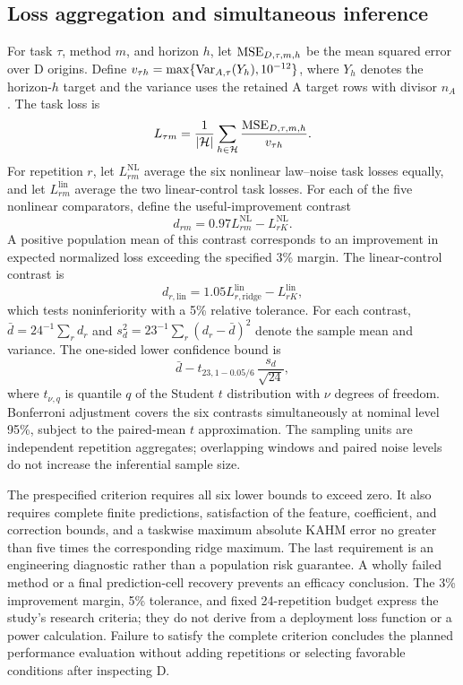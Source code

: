 \subsection{Loss aggregation and simultaneous inference}

For task $\tau$, method $m$, and horizon $h$, let
$\operatorname{MSE}_{D,\tau,m,h}$ be the mean squared error over D origins. Define
$v_{\tau h}=\max\{\operatorname{Var}_{A,\tau}(Y_h),10^{-12}\}$, where $Y_h$
denotes the horizon-$h$ target and the
variance uses the retained A target rows with divisor $n_A$. The task loss is
\[
 L_{\tau m}=\frac1{|\mathcal H|}\sum_{h\in\mathcal H}
       \frac{\operatorname{MSE}_{D,\tau,m,h}}{v_{\tau h}}.
\]
For repetition $r$, let $L^{\mathrm{NL}}_{rm}$ average the six nonlinear
law--noise task losses equally, and let $L^{\mathrm{lin}}_{rm}$ average
the two linear-control task losses. For each of the five nonlinear
comparators, define the useful-improvement contrast
\[
 d_{rm}=0.97L^{\mathrm{NL}}_{rm}-L^{\mathrm{NL}}_{rK}.
\]
A positive population mean of this contrast corresponds to an improvement
in expected normalized loss exceeding the specified 3\% margin.
The linear-control contrast is
\[
 d_{r,\mathrm{lin}}=1.05L^{\mathrm{lin}}_{r,\mathrm{ridge}}
                          -L^{\mathrm{lin}}_{rK},
\]
which tests noninferiority with a 5\% relative tolerance. For each
contrast, $\bar d=24^{-1}\sum_r d_r$ and
$s_d^2=23^{-1}\sum_r(d_r-\bar d)^2$ denote the sample mean and variance.
The one-sided lower confidence bound is
\[
 \bar d-t_{23,1-0.05/6}\,\frac{s_d}{\sqrt{24}},
\]
where $t_{\nu,q}$ is quantile $q$ of the Student $t$ distribution with
$\nu$ degrees of freedom. Bonferroni adjustment covers the six contrasts
simultaneously at nominal level 95\%, subject to the paired-mean
$t$ approximation. The sampling units are independent repetition
aggregates; overlapping windows and paired noise levels do not increase
the inferential sample size.

The prespecified criterion requires all six lower bounds to exceed zero.
It also requires complete finite predictions, satisfaction of the
feature, coefficient, and correction bounds, and a taskwise maximum
absolute KAHM error no greater than five times the corresponding ridge
maximum. The last requirement is an engineering diagnostic rather than
a population risk guarantee. A wholly failed method or a final
prediction-cell recovery prevents an efficacy conclusion. The 3\%
improvement margin, 5\% tolerance, and fixed 24-repetition budget express
the study's research criteria; they do not derive from a deployment loss
function or a power calculation. Failure to satisfy the complete criterion
concludes the planned performance evaluation without adding repetitions
or selecting favorable conditions after inspecting D.

